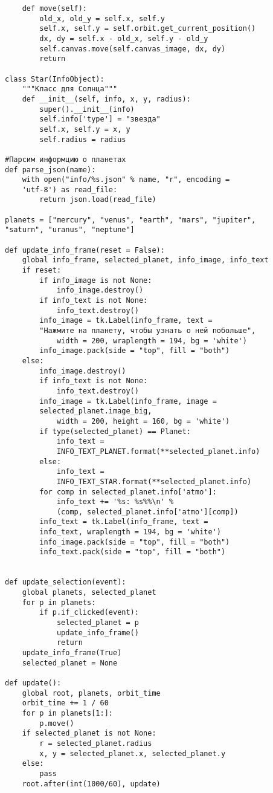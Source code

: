 \documentclass[a4paper,14pt]{extarticle}
\begin{document}
\begin{verbatim}
    def move(self):
        old_x, old_y = self.x, self.y
        self.x, self.y = self.orbit.get_current_position()
        dx, dy = self.x - old_x, self.y - old_y
        self.canvas.move(self.canvas_image, dx, dy)
        return

class Star(InfoObject):
    """Класс для Солнца"""
    def __init__(self, info, x, y, radius):
        super().__init__(info)
        self.info['type'] = "звезда"
        self.x, self.y = x, y
        self.radius = radius

#Парсим информцию о планетах
def parse_json(name):
    with open("info/%s.json" % name, "r", encoding = 
    'utf-8') as read_file:
        return json.load(read_file)

planets = ["mercury", "venus", "earth", "mars", "jupiter",
"saturn", "uranus", "neptune"]

def update_info_frame(reset = False):
    global info_frame, selected_planet, info_image, info_text
    if reset:
        if info_image is not None:
            info_image.destroy()
        if info_text is not None:
            info_text.destroy()
        info_image = tk.Label(info_frame, text = 
        "Нажмите на планету, чтобы узнать о ней побольше", 
            width = 200, wraplength = 194, bg = 'white')
        info_image.pack(side = "top", fill = "both")
    else:
        info_image.destroy()
        if info_text is not None:
            info_text.destroy()
        info_image = tk.Label(info_frame, image =
        selected_planet.image_big,
            width = 200, height = 160, bg = 'white')
        if type(selected_planet) == Planet:
            info_text = 
            INFO_TEXT_PLANET.format(**selected_planet.info)
        else:
            info_text = 
            INFO_TEXT_STAR.format(**selected_planet.info)
        for comp in selected_planet.info['atmo']:
            info_text += '%s: %s%%\n' % 
            (comp, selected_planet.info['atmo'][comp])
        info_text = tk.Label(info_frame, text = 
        info_text, wraplength = 194, bg = 'white')
        info_image.pack(side = "top", fill = "both")
        info_text.pack(side = "top", fill = "both")


def update_selection(event):
    global planets, selected_planet
    for p in planets:
        if p.if_clicked(event):
            selected_planet = p
            update_info_frame()
            return
    update_info_frame(True)
    selected_planet = None

def update():
    global root, planets, orbit_time
    orbit_time += 1 / 60
    for p in planets[1:]:
        p.move()
    if selected_planet is not None:
        r = selected_planet.radius
        x, y = selected_planet.x, selected_planet.y
    else:
        pass
    root.after(int(1000/60), update)


\end{verbatim}
\end{document}
